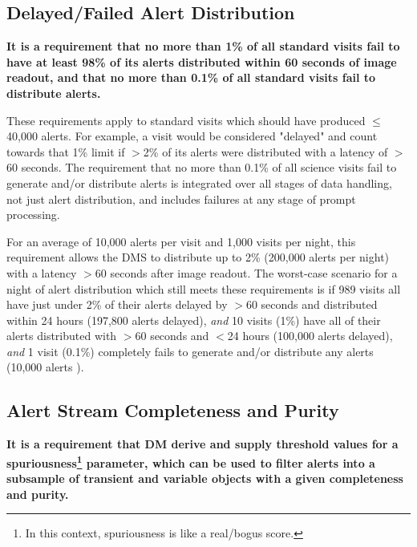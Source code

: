 \documentclass[DM,authoryear,toc]{lsstdoc}
\begin{document}
\subsection{Delayed/Failed \gls{Alert} Distribution}\label{ssec:OTR1}

{\bf It is a requirement that no more than 1\% of all standard visits fail to have at least 98\% of its alerts distributed within 60 seconds of image readout, and that no more than 0.1\% of all standard visits fail to distribute alerts.}

These requirements apply to standard visits which should have produced $\leq$40,000 alerts. For example, a visit would be considered "delayed" and count towards that 1\% limit if $>$2\% of its alerts were distributed with a latency of $>$60 seconds. The requirement that no more than 0.1\% of all science visits fail to generate and/or distribute alerts is integrated over all stages of data handling, not just alert distribution, and includes failures at any stage of prompt processing.

For an average of 10,000 alerts per visit and 1,000 visits per night, this requirement allows the \gls{DMS} to distribute up to 2\% (200,000 alerts per night) with a latency $>$60 seconds after image readout.
The worst-case scenario for a night of alert distribution which still meets these requirements is if 989 visits all have just under 2\% of their alerts delayed by $>$60 seconds and distributed within 24 hours (197,800 alerts delayed), {\it and} 10 visits (1\%) have all of their alerts distributed with $>$60 seconds and $<$24 hours (100,000 alerts delayed), {\it and} 1 visit (0.1\%) completely fails to generate and/or distribute any alerts (10,000 alerts ).


\subsection{Alert Stream Completeness and Purity}\label{ssec:comp_pure}

{\bf It is a requirement that \gls{DM} derive and supply threshold values for a spuriousness\footnote{In this context, spuriousness is like a real/bogus score.} parameter, which can be used to filter alerts into a subsample of \gls{transient} and variable objects with a given completeness and purity.}
\end{document}
